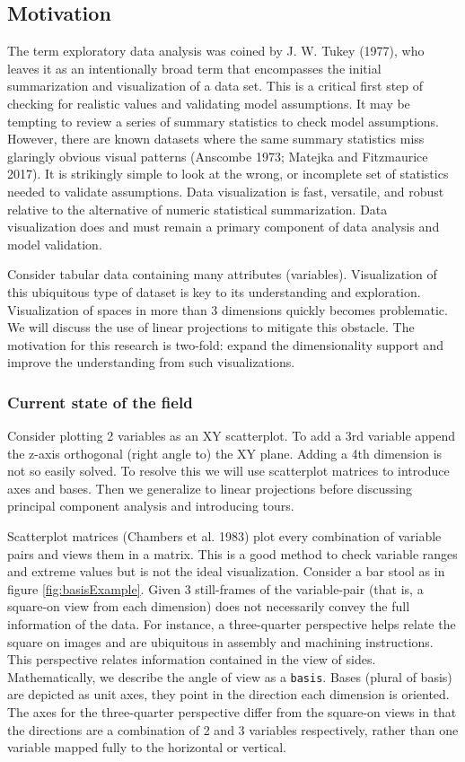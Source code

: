 \documentclass[11,]{article}
\theoremstyle{definition}
\theoremstyle{definition}
\theoremstyle{definition}
\theoremstyle{remark}
\begin{document}
\subsection{Motivation}\label{motivation}

The term exploratory data analysis was coined by J. W. Tukey (1977), who
leaves it as an intentionally broad term that encompasses the initial
summarization and visualization of a data set. This is a critical first
step of checking for realistic values and validating model assumptions.
It may be tempting to review a series of summary statistics to check
model assumptions. However, there are known datasets where the same
summary statistics miss glaringly obvious visual patterns (Anscombe
1973; Matejka and Fitzmaurice 2017). It is strikingly simple to look at
the wrong, or incomplete set of statistics needed to validate
assumptions. Data visualization is fast, versatile, and robust relative
to the alternative of numeric statistical summarization. Data
visualization does and must remain a primary component of data analysis
and model validation.

Consider tabular data containing many attributes (variables).
Visualization of this ubiquitous type of dataset is key to its
understanding and exploration. Visualization of spaces in more than 3
dimensions quickly becomes problematic. We will discuss the use of
linear projections to mitigate this obstacle. The motivation for this
research is two-fold: expand the dimensionality support and improve the
understanding from such visualizations.

\subsubsection{Current state of the
field}\label{current-state-of-the-field}

Consider plotting 2 variables as an XY scatterplot. To add a 3rd
variable append the z-axis orthogonal (right angle to) the XY plane.
Adding a 4th dimension is not so easily solved. To resolve this we will
use scatterplot matrices to introduce axes and bases. Then we generalize
to linear projections before discussing principal component analysis and
introducing tours.

Scatterplot matrices (Chambers et al. 1983) plot every combination of
variable pairs and views them in a matrix. This is a good method to
check variable ranges and extreme values but is not the ideal
visualization. Consider a bar stool as in figure \ref{fig:basisExample}.
Given 3 still-frames of the variable-pair (that is, a square-on view
from each dimension) does not necessarily convey the full information of
the data. For instance, a three-quarter perspective helps relate the
square on images and are ubiquitous in assembly and machining
instructions. This perspective relates information contained in the view
of sides. Mathematically, we describe the angle of view as a
\texttt{basis}. Bases (plural of basis) are depicted as unit axes, they
point in the direction each dimension is oriented. The axes for the
three-quarter perspective differ from the square-on views in that the
directions are a combination of 2 and 3 variables respectively, rather
than one variable mapped fully to the horizontal or vertical.
\end{document}
